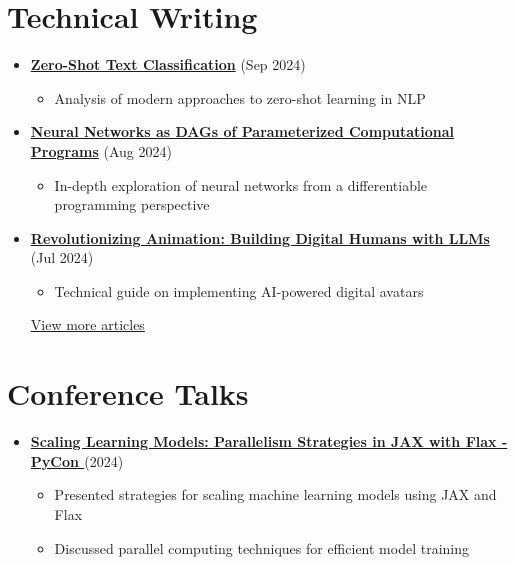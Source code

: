 \documentclass[letterpaper,11pt]{article}
\newcommand{\normalfaExternalLink}{{\mdseries\faExternalLink}}
\newcommand{\normalfaYoutube}{{\mdseries\faYoutube}}
\begin{document}
\section{Technical Writing}
\begin{itemize}[leftmargin=*]

    \item \textbf{\href{https://www.asanchezyali.com/blog/en/ai/20240917ZeroShot}{Zero-Shot Text Classification}} (Sep 2024)
    \begin{itemize}
        \item Analysis of modern approaches to zero-shot learning in NLP
    \end{itemize} 
    
    \item \textbf{\href{https://www.asanchezyali.com/blog/en/differentiable-programming/20240923DifferentiablePrograms}{Neural Networks as DAGs of Parameterized Computational Programs}} (Aug 2024)
    \begin{itemize}
        \item In-depth exploration of neural networks from a differentiable programming perspective
    \end{itemize}
    

    
    \item \textbf{\href{https://www.asanchezyali.com/blog/en/ai-avatars/20240703DigitalHuman}{Revolutionizing Animation: Building Digital Humans with LLMs}} (Jul 2024)
    \begin{itemize}
        \item Technical guide on implementing AI-powered digital avatars
    \end{itemize}
    
    \href{https://www.asanchezyali.com/}{View more articles \normalfaExternalLink}
\end{itemize}

\section{Conference Talks}
\begin{itemize}[leftmargin=*]
    \item \textbf{\href{https://www.youtube.com/watch?v=m4hP1soE414}{Scaling Learning Models: Parallelism Strategies in JAX with Flax - PyCon \normalfaYoutube}} (2024)
    \begin{itemize}
        \item Presented strategies for scaling machine learning models using JAX and Flax
        \item Discussed parallel computing techniques for efficient model training
    \end{itemize}
\end{itemize}
\end{document}

